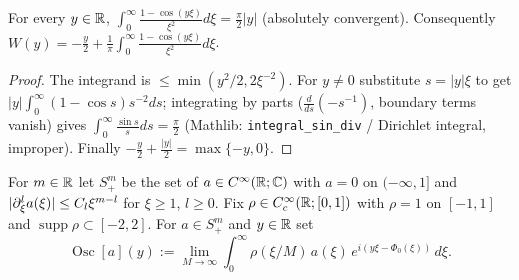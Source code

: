 \begin{lemma}
  \label{lem:c04_dirichlet}
  For every $y\in\mathbb{R}$, $\int_0^\infty\frac{1-\cos(y\xi)}{\xi^2}d\xi=\frac\pi2|y|$ (absolutely convergent).
  Consequently $W(y)=-\frac y2+\frac1\pi\int_0^\infty\frac{1-\cos(y\xi)}{\xi^2}d\xi$.
\end{lemma}
\begin{proof}
  The integrand is $\le\min(y^2/2,2\xi^{-2})$. For $y\ne0$ substitute $s=|y|\xi$ to get $|y|\int_0^\infty(1-\cos s)s^{-2}ds$;
  integrating by parts ($\frac{d}{ds}(-s^{-1})$, boundary terms vanish) gives $\int_0^\infty\frac{\sin s}{s}ds=\frac\pi2$
  (Mathlib: \texttt{integral\_sin\_div} / Dirichlet integral, improper). Finally $-\frac y2+\frac{|y|}2=\max\{-y,0\}$.
\end{proof}

\begin{definition}
  \label{def:c04_osc_integral}
  For $m\in\mathbb{R}$ let $S^m_+$ be the set of $a\in C^\infty(\mathbb{R};\mathbb{C})$ with $a=0$ on $(-\infty,1]$ and
  $|\partial^l_\xi a(\xi)|\le C_l\xi^{m-l}$ for $\xi\ge1$, $l\ge0$. Fix $\rho\in C^\infty_c(\mathbb{R};[0,1])$ with $\rho=1$ on
  $[-1,1]$ and $\operatorname{supp}\rho\subset[-2,2]$. For $a\in S^m_+$ and $y\in\mathbb{R}$ set
  \[
    \operatorname{Osc}[a](y):=\lim_{M\to\infty}\int_0^\infty\rho(\xi/M)\,a(\xi)\,e^{i(y\xi-\Phi_0(\xi))}\,d\xi .
  \]
\end{definition}

